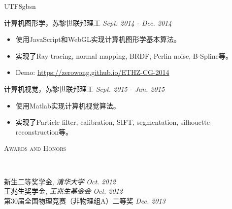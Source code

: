 \documentclass[a4paper]{article}
\newenvironment{changemargin}[2]{%
  \begin{list}{}{%
    \setlength{\topsep}{0pt}%
    \setlength{\leftmargin}{#1}%
    \setlength{\rightmargin}{#2}%
    \setlength{\listparindent}{\parindent}%
    \setlength{\itemindent}{\parindent}%
    \setlength{\parsep}{\parskip}%
  }%
  \item[]}{\end{list}
}
\newcommand{\lineover}{
	\begin{changemargin}{-0.05in}{-0.05in}
		\vspace*{-8pt}
		\hrulefill \\
		\vspace*{-2pt}
	\end{changemargin}
}
\newcommand{\header}[1]{
	\begin{changemargin}{-0.5in}{-0.5in}
		\scshape{#1}\\
  	\lineover
	\end{changemargin}
}
\newenvironment{body} {
	\vspace*{-16pt}
	\begin{changemargin}{-0.25in}{-0.5in}
  }	
	{\end{changemargin}
}
\begin{document}
\begin{CJK*}{UTF8}{gbsn}
\begin{body}
	\vspace{14pt}
	计算机图形学，苏黎世联邦理工 \hfill \emph{Sept. 2014 - Dec. 2014}
	\begin{itemize}
	\itemsep 0pt
	\item 使用JavaScript和WebGL实现计算机图形学基本算法。
	\item 实现了Ray tracing, normal mapping, BRDF, Perlin noise, B-Spline等。
	\item Demo: \href{https://zerowong.github.io/ETHZ-CG-2014}{https://zerowong.github.io/ETHZ-CG-2014}
	\end{itemize}
	\smallskip
	计算机视觉，苏黎世联邦理工 \hfill \emph{Sept. 2015 - Jan. 2015}
	\begin{itemize}
	\itemsep 0pt
	\item 使用Matlab实现计算机视觉算法。
	\item 实现了Particle filter, calibration, SIFT, segmentation, silhouette reconstruction等。
	\end{itemize}
	\smallskip

\end{body}
\smallskip
\smallskip

\header{Awards and Honors}

\begin{body}
	\vspace{14pt}
	新生二等奖学金, \emph{清华大学} \hfill{} \emph{Oct. 2012}\\
	\smallskip
	王兆生奖学金, \emph{王兆生基金会} \hfill{} \emph{Oct. 2012}\\
	\smallskip
	第30届全国物理竞赛（非物理组A）二等奖 \hfill{} \emph{Dec. 2013}\\
\end{body}

\smallskip
\smallskip





\end{CJK*}
\end{document}
